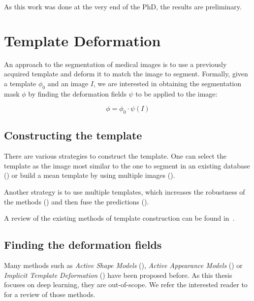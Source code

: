 As this work was done at the very end of the PhD, the results are preliminary.

\section{Template Deformation}
\label{sec:seg_biblio}

An approach to the segmentation of medical images is to use a previously acquired template and deform it to match the image to segment. Formally, given a template $\phi_0$ and an image $I$, we are interested in obtaining the segmentation mask $\phi$ by finding the deformation fields $\psi$ to be applied to the image:

\begin{equation}
    \phi = \phi_0 \cdot \psi \left( I \right)
\end{equation}

\subsection{Constructing the template}

There are various strategies to construct the template. One can select the template as the image most similar to the one to segment in an existing database (\textcite{commowick2007MICCAI}) or build a mean template by using multiple images (\textcite{joshi2004}).

Another strategy is to use multiple templates, which increases the robustness of the methods (\textcite{heckemann2006}) and then fuse the predictions (\textcite{warfield2004}). 

A review of the existing methods of template construction can be found in~\textcite{cabezas2011}.

\subsection{Finding the deformation fields}

Many methods such as \textit{Active Shape Models} (\textcite{cootes1995}), \textit{Active Appearance Models} (\textcite{cootes1998ECCV}) or \textit{Implicit Template Deformation} (\textcite{mory2012MICCAI}) have been proposed before. As this thesis focuses on deep learning, they are out-of-scope. We refer the interested reader to~\textcite{heimann2009} for a review of those methods.

